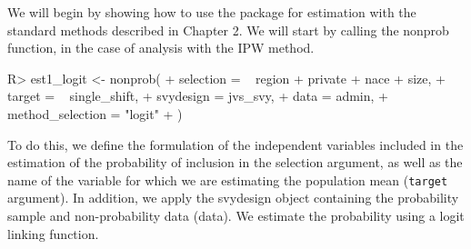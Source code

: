 \documentclass[
]{jss}
\begin{document}
We will begin by showing how to use the package for estimation with the
standard methods described in Chapter 2. We will start by calling the
nonprob function, in the case of analysis with the IPW method.

\begin{CodeChunk}
\begin{CodeInput}
R> est1_logit <- nonprob(
+   selection = ~ region + private + nace + size,
+   target = ~ single_shift,
+   svydesign = jvs_svy,
+   data = admin,
+   method_selection = "logit"
+ )
\end{CodeInput}
\end{CodeChunk}

To do this, we define the formulation of the independent variables
included in the estimation of the probability of inclusion in the
selection argument, as well as the name of the variable for which we are
estimating the population mean (\texttt{target} argument). In addition,
we apply the svydesign object containing the probability sample and
non-probability data (data). We estimate the probability using a logit
linking function.
\end{document}
